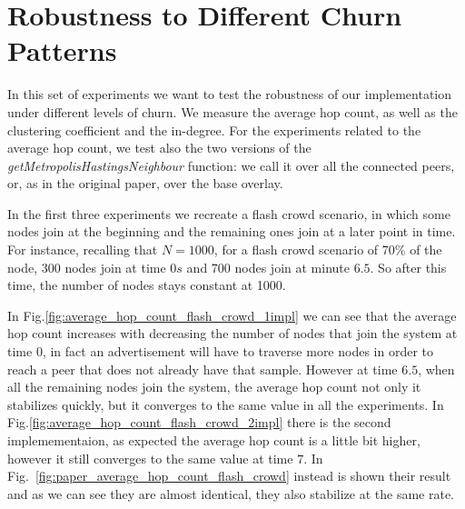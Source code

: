 \section{Robustness to Different Churn Patterns}
\label{sec:robustness}
In this set of experiments we want to test the robustness of our implementation under different levels of churn. We measure the average hop count, as well as the clustering coefficient and the in-degree. For the experiments related to the average hop count, we test also the two versions of the \textit{getMetropolisHastingsNeighbour} function: we call it over all the connected peers, or, as in the original paper, over the base overlay.

In the first three experiments we recreate a flash crowd scenario, in which some nodes join at the beginning and the remaining ones join at a later point in time. For instance, recalling that $N = 1000$, for a flash crowd scenario of 70\% of the node, 300 nodes join at time $0s$ and 700 nodes join at minute $6.5$. So after this time, the number of nodes stays constant at 1000. 

In Fig.\ref{fig:average_hop_count_flash_crowd_1impl} we can see that the average hop count increases with decreasing the number of nodes that join the system at time 0, in fact an advertisement will have to traverse more nodes in order to reach a peer that does not already have that sample. However at time $6.5$, when all the remaining nodes join the system, the average hop count not only it stabilizes quickly, but it converges to the same value in all the experiments. In Fig.\ref{fig:average_hop_count_flash_crowd_2impl} there is the second implemementaion, as expected the average hop count is a little bit higher, however it still converges to the same value at time $7$. In Fig.~\ref{fig:paper_average_hop_count_flash_crowd} instead is shown their result and as we can see they are almost identical, they also stabilize at the same rate. 

